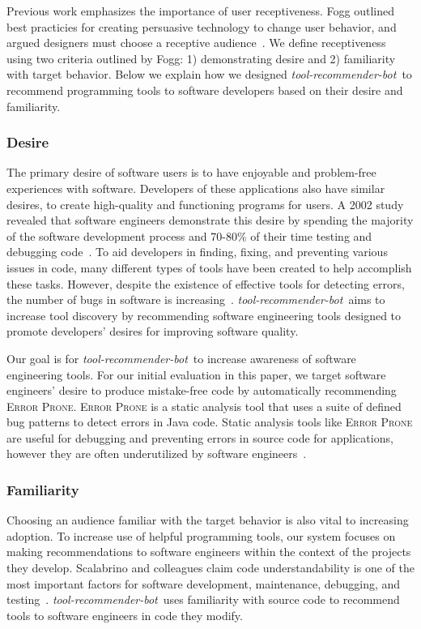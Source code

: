 \documentclass[sigconf,review,anonymous]{acmart}
\newcommand{\tool}{\textsl{tool-recommender-bot}}
\begin{document}
Previous work emphasizes the importance of user receptiveness. Fogg outlined best practicies for creating persuasive technology to change user behavior, and argued designers must choose a receptive audience~\cite{FoggPersuasive}. We define receptiveness using two criteria outlined by Fogg: 1) demonstrating desire and 2) familiarity with target behavior. Below we explain how we designed \tool~to recommend programming tools to software developers based on their desire and familiarity.

\subsubsection{Desire}

The primary desire of software users is to have enjoyable and problem-free experiences with software. Developers of these applications also have similar desires, to create high-quality and functioning programs for users. A 2002 study revealed that software engineers demonstrate this desire by spending the majority of the software development process and 70-80\% of their time testing and debugging code~\cite{NIST}. To aid developers in finding, fixing, and preventing various issues in code, many different types of tools have been created to help accomplish these tasks. However, despite the existence of effective tools for detecting errors, the number of bugs in software is increasing~\cite{HaveThingsChanged}. \tool~aims to increase tool discovery by recommending software engineering tools designed to promote developers' desires for improving software quality.

Our goal is for \tool~to increase awareness of software engineering tools. For our initial evaluation in this paper, we target software engineers' desire to produce mistake-free code by automatically recommending \textsc{Error Prone}. \textsc{Error Prone} is a static analysis tool that uses a suite of defined bug patterns to detect errors in Java code. Static analysis tools like \textsc{Error Prone} are useful for debugging and preventing errors in source code for applications, however they are often underutilized by software engineers~\cite{Johnson2013Why}. 

\subsubsection{Familiarity}

Choosing an audience familiar with the target behavior is also vital to increasing adoption. To increase use of helpful programming tools, our system focuses on making recommendations to software engineers within the context of the projects they develop. Scalabrino and colleagues claim code understandability is one of the most important factors for software development, maintenance, debugging, and testing~\cite{Scalabrino2017Understandability}. \tool~uses familiarity with source code to recommend tools to software engineers in code they modify.
\end{document}
